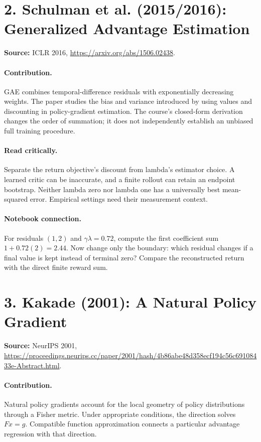 \documentclass[11pt]{scrartcl}
\begin{document}
\section*{2. Schulman et al. (2015/2016): Generalized Advantage Estimation}
\textbf{Source:} ICLR 2016, \url{https://arxiv.org/abs/1506.02438}.

\paragraph{Contribution.} GAE combines temporal-difference residuals with
exponentially decreasing weights. The paper studies the bias and variance
introduced by using values and discounting in policy-gradient estimation.
The course's closed-form derivation changes the order of summation; it does
not independently establish an unbiased full training procedure.

\paragraph{Read critically.} Separate the return objective's discount from
lambda's estimator choice. A learned critic can be inaccurate, and a finite
rollout can retain an endpoint bootstrap. Neither lambda zero nor lambda one
has a universally best mean-squared error. Empirical settings need their
measurement context.

\paragraph{Notebook connection.} For residuals $(1,2)$ and $\gamma\lambda=0.72$,
compute the first coefficient sum $1+0.72(2)=2.44$. Now change only the boundary:
which residual changes if a final value is kept instead of terminal zero?
Compare the reconstructed return with the direct finite reward sum.

\section*{3. Kakade (2001): A Natural Policy Gradient}
\textbf{Source:} NeurIPS 2001,
\url{https://proceedings.neurips.cc/paper/2001/hash/4b86abe48d358ecf194c56c69108433e-Abstract.html}.

\paragraph{Contribution.} Natural policy gradients account for the local
geometry of policy distributions through a Fisher metric. Under appropriate
conditions, the direction solves $Fx=g$. Compatible function approximation
connects a particular advantage regression with that direction.
\end{document}
